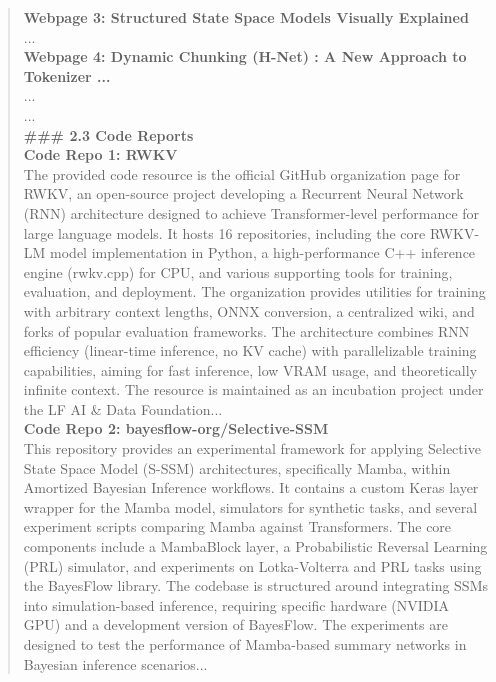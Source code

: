 \begin{quote}
\begin{tcolorbox}[breakable,colback=almond!20!white, colframe=almond!60!black, title=\textbf{Case Study (Mamba: Linear-Time Sequence Modeling with Selective State Spaces)}]
        \textbf{Webpage 3: Structured State Space Models Visually Explained}\\
        ...\\

        \textbf{Webpage 4: Dynamic Chunking (H-Net) : A New Approach to Tokenizer ...}\\
        ...\\
        ...\\

        \textbf{\#\#\# 2.3 Code Reports}\\

        \textbf{Code Repo 1: RWKV}\\
        The provided code resource is the official GitHub organization page for RWKV, an open-source project developing a Recurrent Neural Network (RNN) architecture designed to achieve Transformer-level performance for large language models. It hosts 16 repositories, including the core RWKV-LM model implementation in Python, a high-performance C++ inference engine (rwkv.cpp) for CPU, and various supporting tools for training, evaluation, and deployment. The organization provides utilities for training with arbitrary context lengths, ONNX conversion, a centralized wiki, and forks of popular evaluation frameworks. The architecture combines RNN efficiency (linear-time inference, no KV cache) with parallelizable training capabilities, aiming for fast inference, low VRAM usage, and theoretically infinite context. The resource is maintained as an incubation project under the LF AI \& Data Foundation...\\

        \textbf{Code Repo 2: bayesflow-org/Selective-SSM}\\
        This repository provides an experimental framework for applying Selective State Space Model (S-SSM) architectures, specifically Mamba, within Amortized Bayesian Inference workflows. It contains a custom Keras layer wrapper for the Mamba model, simulators for synthetic tasks, and several experiment scripts comparing Mamba against Transformers. The core components include a MambaBlock layer, a Probabilistic Reversal Learning (PRL) simulator, and experiments on Lotka-Volterra and PRL tasks using the BayesFlow library. The codebase is structured around integrating SSMs into simulation-based inference, requiring specific hardware (NVIDIA GPU) and a development version of BayesFlow. The experiments are designed to test the performance of Mamba-based summary networks in Bayesian inference scenarios...\\


\end{tcolorbox}
\end{quote}
